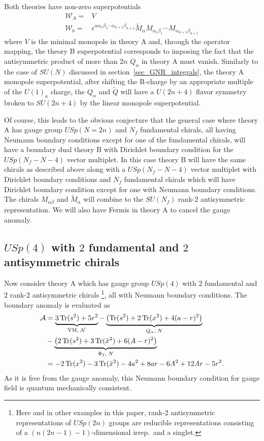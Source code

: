 \documentclass[12pt]{article}
\newcommand{\Acal}{\mathcal{A}}
\newcommand{\Ncal}{\mathcal{N}}
\newcommand{\Wcal}{\mathcal{W}}
\DeclareMathOperator*{\Tr}{{\rm Tr}}
\numberwithin{equation}{section}
\begin{document}
Both theories have non-zero superpotentials
\begin{align}
    \Wcal_A = & V \\
    \Wcal_b = & \epsilon^{\alpha \alpha_1 \beta_1 \cdots \alpha_{n+1} \beta_{n+1}} \widetilde{M}_{\alpha} M_{\alpha_1 \beta_1} \cdots M_{\alpha_{n+1} \beta_{n+1}}
\end{align}
where $V$ is the minimal monopole in theory A and, through the operator mapping, the theory B superpotential corresponds to imposing the fact that the antisymmetric product of more than $2n$ $Q_{\alpha}$ in theory A must vanish. Similarly to the case of $SU(N)$ discussed in section~\ref{sec_GNR_integrals}, the theory A monopole superpotential, after shifting the R-charge by an appropriate multiple of the $U(1)_a$ charge, the $Q_{\alpha}$ and $\widetilde{Q}$ will have a $U(2n + 4)$ flavor symmetry broken to $SU(2n + 4)$ by the linear monopole superpotential.

Of course, this leads to the obvious conjecture that the general case where theory
A has gauge group $USp(N = 2n)$ and $N_f$ fundamental chirals,
all having Neumann boundary conditions except for one of the fundamental chirals, will have a boundary dual theory B with Dirichlet boundary condition for the $USp(N_f - N - 4)$ vector multiplet. In this case theory B will
have the same chirals as described above along with a $USp(N_f - N - 4)$ vector multiplet
with Dirichlet boundary conditions and $N_f$ fundamental chirals which will have Dirichlet boundary condition except for one with Neumann boundary conditions. The chirals $M_{\alpha \beta}$ and $\widetilde{M}_{\alpha}$ will combine to the $SU(N_f)$ rank-$2$ antisymmetric representation. We will also have Fermis in theory A to cancel the gauge anomaly.

\subsection{$USp(4)$ with $2$ fundamental and $2$ antisymmetric chirals}
\label{sec_GNR_USp4_2_2AS_integral}
Now consider theory A which has gauge group $USp(4)$ with $2$ fundamental and $2$ rank-$2$ antisymmetric chirals \footnote{Here and in other examples in this paper, rank-$2$ antisymmetric representations of $USp(2n)$ groups are reducible representations consisting of a $(n(2n-1) - 1)$-dimensional irrep.\ and a singlet.}, all with Neumann boundary conditions. 
The boundary anomaly is evaluated as
\begin{align}
\label{bdy_USp4_2_2AS_anomA}
\Acal &=\underbrace{3\Tr(s^2) + 5r^2}_{\textrm{VM}, \; \Ncal}
 - \underbrace{\left( \Tr(s^2) + 2\Tr(x^2) + 4(a-r)^2 \right)}_{Q_{\alpha}, \; N}
 \nonumber\\
& - \underbrace{\left( 2\Tr(s^2) + 3\Tr(\tilde{x}^2) + 6(A-r)^2 \right)}_{\Phi_I, \; N}
\nonumber\\
&=- 2\Tr(x^2) - 3\Tr(\tilde{x}^2) - 4a^2 + 8ar - 6A^2 + 12Ar - 5r^2. 
\end{align}
As it is free from the gauge anomaly, this Neumann boundary condition for gauge field is quantum mechanically consistent. 
\end{document}
